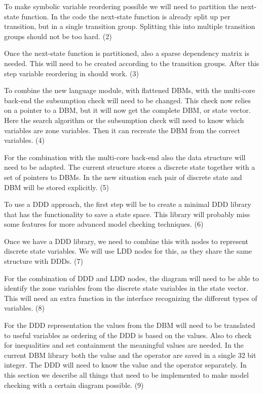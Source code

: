 To make symbolic variable reordering possible we will need to partition the next-state function. In the code the next-state function is already split up per transition, but in a single transition group. Splitting this into multiple transition groups should not be too hard. (2)

Once the next-state function is partitioned, also a sparse dependency matrix is needed. This will need to be created according to the transition groups. After this step variable reordering in \ltsmin{} should work. (3)

To combine the new language module, with flattened DBMs, with the multi-core \ltsmin{} back-end the subsumption check will need to be changed. This check now relies on a pointer to a DBM, but it will now get the complete DBM, or state vector. Here the search algorithm or the subsumption check will need to know which variables are zone variables. Then it can recreate the DBM from the correct variables. (4)

For the combination with the multi-core back-end also the data structure will need to be adapted. The current structure stores a discrete state together with a set of pointers to DBMs. In the new situation each pair of discrete state and DBM will be stored explicitly. (5)

To use a DDD approach, the first step will be to create a minimal DDD library that has the functionality to save a state space. This library will probably miss some features for more advanced model checking techniques. (6)

Once we have a DDD library, we need to combine this with nodes to represent discrete state variables. We will use LDD nodes for this, as they share the same structure with DDDs. (7)

For the combination of DDD and LDD nodes, the diagram will need to be able to identify the zone variables from the discrete state variables in the state vector. This will need an extra function in the \pins{} interface recognizing the different types of variables. (8)

For the DDD representation the values from the DBM will need to be translated to useful variables as ordering of the DDD is based on the values. Also to check for inequalities and set containment the meaningful values are needed. In the current DBM library both the value and the operator are saved in a single 32 bit integer. The DDD will need to know the value and the operator separately.
In this section we describe all things that need to be implemented to make model checking with a certain diagram possible. (9)

